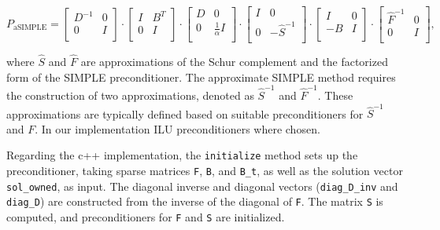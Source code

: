 \documentclass{article}
\begin{document}
\begin{equation}
    P_{\text{aSIMPLE}} =
    \begin{bmatrix}
        D^{-1} & 0 \\
        0 & I \\
    \end{bmatrix}
    \cdot
    \begin{bmatrix}
        I & B^T \\
        0 & I \\
    \end{bmatrix}
    \cdot
    \begin{bmatrix}
        D & 0 \\
        0 & \frac{1}{\alpha}I \\
    \end{bmatrix}
    \cdot
    \begin{bmatrix}
        I & 0\\
        0 & -\hat{S}^{-1} \\
    \end{bmatrix}
    \cdot
    \begin{bmatrix}
        I & 0 \\
        -B & I \\
    \end{bmatrix}
    \cdot
    \begin{bmatrix}
        \hat{F}^{-1} & 0 \\
        0 & I \\
    \end{bmatrix},
\end{equation}

where \(\hat{S}\) and \(\hat{F}\) are approximations of the Schur complement and the factorized form of the SIMPLE preconditioner.
The approximate SIMPLE method requires the construction of two approximations, denoted as \(\hat{S}^{-1}\) and \(\hat{F}^{-1}\). These approximations are typically defined based on suitable preconditioners for \(\hat{S}^{-1}\) and \(F\). In our implementation ILU preconditioners where chosen.


Regarding the c++ implementation, the \texttt{initialize} method sets up the preconditioner, taking sparse matrices \texttt{F}, \texttt{B}, and \texttt{B\_t}, as well as the solution vector \texttt{sol\_owned}, as input. The diagonal inverse and diagonal vectors (\texttt{diag\_D\_inv} and \texttt{diag\_D}) are constructed from the inverse of the diagonal of \texttt{F}. The matrix \texttt{S} is computed, and preconditioners for \texttt{F} and \texttt{S} are initialized.
\end{document}

